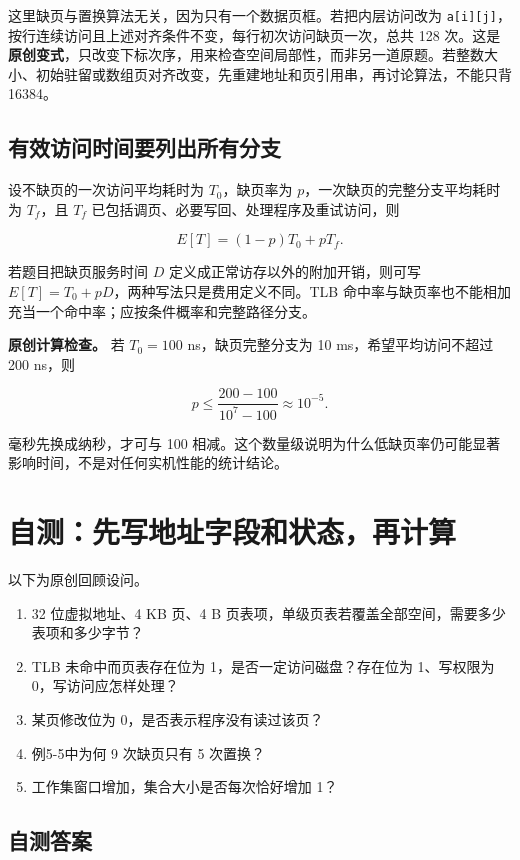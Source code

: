 这里缺页与置换算法无关，因为只有一个数据页框。若把内层访问改为 \allowbreak{}\texttt{a{[}i{]}{[}j{]}}，按行连续访问且上述对齐条件不变，每行初次访问缺页一次，总共 128 次。这是\textbf{原创变式}，只改变下标次序，用来检查空间局部性，而非另一道原题。若整数大小、初始驻留或数组页对齐改变，先重建地址和页引用串，再讨论算法，不能只背 16384。

\subsection{有效访问时间要列出所有分支}\label{os-c05-h265}

设不缺页的一次访问平均耗时为 \(T_0\)，缺页率为 \(p\)，一次缺页的完整分支平均耗时为 \(T_f\)，且 \(T_f\) 已包括调页、必要写回、处理程序及重试访问，则

\[E[T]=(1-p)T_0+pT_f.\]

若题目把缺页服务时间 \(D\) 定义成正常访存以外的附加开销，则可写 \(E[T]=T_0+pD\)，两种写法只是费用定义不同。TLB 命中率与缺页率也不能相加充当一个命中率；应按条件概率和完整路径分支。

\textbf{原创计算检查。} 若 \(T_0=100\) ns，缺页完整分支为 10 ms，希望平均访问不超过 200 ns，则

\[p\le\frac{200-100}{10^7-100}\approx10^{-5}.\]

毫秒先换成纳秒，才可与 100 相减。这个数量级说明为什么低缺页率仍可能显著影响时间，不是对任何实机性能的统计结论。

\section{自测：先写地址字段和状态，再计算}\label{os-5-review}

以下为原创回顾设问。

\begin{enumerate}
\def\labelenumi{\arabic{enumi}.}
\tightlist
\item
  32 位虚拟地址、4 KB 页、4 B 页表项，单级页表若覆盖全部空间，需要多少表项和多少字节？
\item
  TLB 未命中而页表存在位为 1，是否一定访问磁盘？存在位为 1、写权限为 0，写访问应怎样处理？
\item
  某页修改位为 0，是否表示程序没有读过该页？
\item
  例5-5中为何 9 次缺页只有 5 次置换？
\item
  工作集窗口增加，集合大小是否每次恰好增加 1？
\end{enumerate}

\subsection{自测答案}\label{os-c05-h289}

